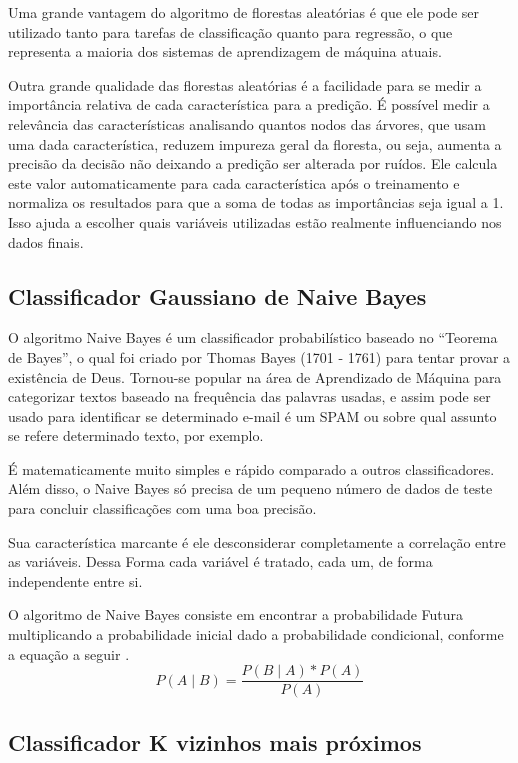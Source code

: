 Uma grande vantagem do algoritmo de florestas aleatórias é que ele pode ser utilizado tanto para tarefas de classificação quanto para regressão, o que representa a maioria dos sistemas de aprendizagem de máquina atuais.

Outra grande qualidade das florestas aleatórias é a facilidade para se medir a importância relativa de cada característica para a predição. É possível medir  a relevância das características analisando quantos nodos das árvores, que usam uma dada característica, reduzem impureza geral da floresta, ou seja, aumenta a precisão da decisão não deixando a predição ser alterada por ruídos. Ele calcula este valor automaticamente para cada característica após o treinamento e normaliza os resultados para que a soma de todas as importâncias seja igual a 1. Isso ajuda a escolher quais variáveis utilizadas estão realmente influenciando nos dados finais\cite{Floresta}. 


\subsection{{Classificador Gaussiano de Naive Bayes}}

O algoritmo Naive Bayes é um classificador probabilístico baseado no “Teorema de Bayes”, o qual foi criado por Thomas Bayes (1701 - 1761) para tentar provar a existência de Deus.
Tornou-se popular na área de Aprendizado de Máquina para categorizar textos baseado na frequência das palavras usadas, e assim pode ser usado para identificar se determinado e-mail é um SPAM ou sobre qual assunto se refere determinado texto, por exemplo.

É matematicamente muito simples e rápido comparado a outros classificadores. Além disso, o Naive Bayes só precisa de um pequeno número de dados de teste para concluir classificações com uma boa precisão\cite{Bayes}.

 Sua característica marcante é ele desconsiderar completamente a correlação entre as variáveis. Dessa Forma cada variável é tratado, cada um, de forma independente entre si.  

O algoritmo de Naive Bayes consiste em encontrar a probabilidade Futura multiplicando a probabilidade inicial dado a probabilidade condicional, conforme a equação a seguir \cite{Bayes2}. 
\begin{equation}
P(A\mid B )= \frac{P(B\mid A )*P(A)}{P(A)}
\end{equation}


\subsection{{Classificador K vizinhos mais próximos}}

